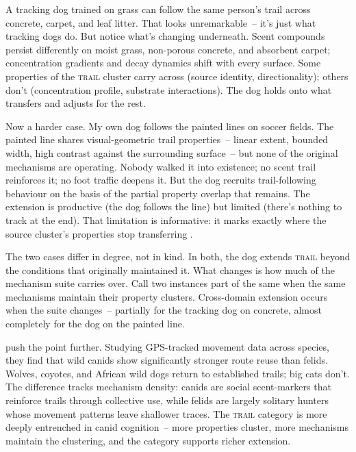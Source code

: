 A tracking dog trained on grass can follow the same person's trail across concrete, carpet, and leaf litter. That looks unremarkable~-- it's just what tracking dogs do. But notice what's changing underneath. Scent compounds persist differently on moist grass, non-porous concrete, and absorbent carpet; concentration gradients and decay dynamics shift with every surface. Some properties of the \textsc{trail} cluster carry across (source identity, directionality); others don't (concentration profile, substrate interactions). The dog holds onto what transfers and adjusts for the rest.

Now a harder case. My own dog follows the painted lines on soccer fields. The painted line shares visual-geometric trail properties~-- linear extent, bounded width, high contrast against the surrounding surface~-- but none of the original mechanisms are operating. Nobody walked it into existence; no scent trail reinforces it; no foot traffic deepens it. But the dog recruits trail-following behaviour on the basis of the partial property overlap that remains. The extension is productive (the dog follows the line) but limited (there's nothing to track at the end). That limitation is informative: it marks exactly where the source cluster's properties stop transferring \citep[see][for the fuller argument and confound analysis]{reynolds2026metaphor}.

The two cases differ in degree, not in kind. In both, the dog extends \textsc{trail} beyond the conditions that originally maintained it. What changes is how much of the mechanism suite carries over. Call two instances part of the same  when the same mechanisms maintain their property clusters. Cross-domain extension occurs when the suite changes~-- partially for the tracking dog on concrete, almost completely for the dog on the painted line.

\textcite{fagan2025} push the point further. Studying GPS-tracked movement data across species, they find that wild canids show significantly stronger route reuse than felids. Wolves, coyotes, and African wild dogs return to established trails; big cats don't. The difference tracks mechanism density: canids are social scent-markers that reinforce trails through collective use, while felids are largely solitary hunters whose movement patterns leave shallower traces. The \textsc{trail} category is more deeply entrenched in canid cognition~-- more properties cluster, more mechanisms maintain the clustering, and the category supports richer extension.

